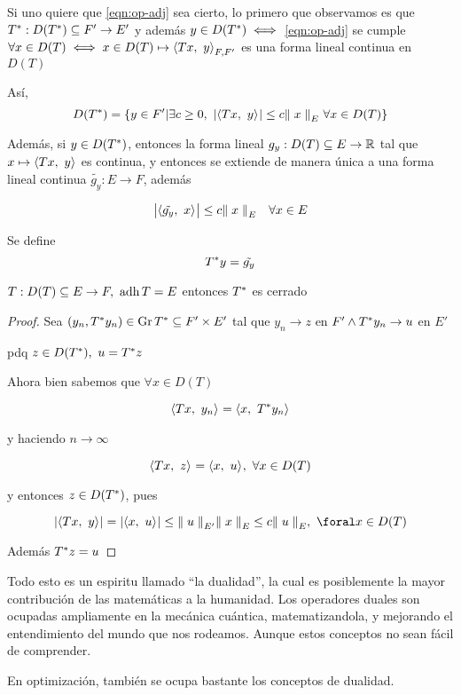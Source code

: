 Si uno quiere que \eqref{eqn:op-adj} sea cierto, lo primero que observamos es que $T\adj : D(T\adj) \subseteq F' \to E' $ y además $y \in D(T\adj) \iff $ \eqref{eqn:op-adj} se cumple $ \forall x \in D(T) \iff x \in D(T) \mapsto \prodint[F, F']{Tx}{y} $ es una forma lineal continua en $D(T)$

Así, $$ D(T\adj) = \{ y  \in F' | \exists c \geq 0 ,\ \abs{ \prodint{Tx}{y} } \leq c \norm[E]{x} \ \forall x \in D(T) \} $$

Además, si $y \in D(T\adj)$, entonces la forma lineal $g_y : D(T) \subseteq E \to \rr $ tal que $ x \mapsto \prodint{Tx}{y} $ es continua, y entonces se extiende de manera única a una forma lineal continua $\tilde{g_y} : E \to F$, además 

$$ \abs{\prodint{ \tilde{g_y} }{x}} \leq c \norm[E]{x} \quad \forall x \in E$$

Se define $$ T\adj y = \tilde{g_y} $$

\begin{prop}
$T: D(T) \subseteq E \to F,\ \adh T = E$ entonces $T\adj$ es cerrado
\end{prop}

\begin{proof}
Sea $(y_n, T\adj y_n) \in \gr T\adj \subseteq F' \times E'$ tal que $y_n \to z $ en $F' \wedge T\adj y_n \to u$  en $E'$

pdq $z \in D(T\adj) ,\ u = T\adj z $

Ahora bien sabemos que $\forall x \in D(T)$

$$ \prodint{Tx}{y_n} = \prodint{x}{T\adj y_n} $$

y haciendo $n \to \infty$

$$ \prodint{Tx}{z} = \prodint{x}{u} ,\ \forall x \in D(T) $$

y entonces $z \in D(T\adj)$, pues

$$ \abs{ \prodint{Tx}{y} } = \abs{ \prodint{x}{u} } \leq \norm[E']{u} \norm[E]{x} \leq c \norm[E]{u} ,\ \foral x \in D(T) $$

Además $T\adj z = u$
\end{proof}

Todo esto es un espiritu llamado ``la dualidad'', la cual es posiblemente la mayor contribución de las matemáticas a la humanidad. Los operadores duales son ocupadas ampliamente en la mecánica cuántica, matematizandola, y mejorando el entendimiento del mundo que nos rodeamos. Aunque estos conceptos no sean fácil de comprender.

En optimización, también se ocupa bastante los conceptos de dualidad.

